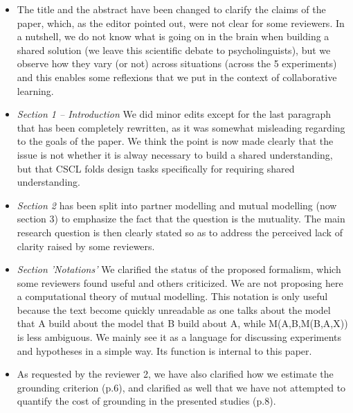 \documentclass{article}
\begin{document}
\begin{itemize}

    \item The title and the abstract have been changed to clarify the
        claims of the paper, which, as the editor pointed out, were not clear
        for some reviewers. In a nutshell, we do not know what is going on in the
        brain when building a shared solution (we leave this scientific debate
        to psycholinguists), but we observe how they vary (or not) across
        situations (across the 5 experiments) and this enables some reflexions
        that we put in the context of collaborative learning.

    \item \emph{Section 1 -- Introduction} We did minor edits except for the last
        paragraph that has been completely rewritten, as it was somewhat misleading
        regarding to the goals of the paper.  We think the point is now made
        clearly that the issue is not whether it is alway necessary to build a
        shared understanding, but that CSCL folds design tasks specifically for
        requiring shared understanding.

    \item \emph{Section 2} has been split into partner modelling and mutual modelling (now
        section 3) to emphasize the fact that the question is the mutuality. The
        main research question is then clearly stated so as to address the
        perceived lack of clarity raised by some reviewers.

    \item \emph{Section 'Notations'} We clarified the status of the proposed formalism, which some
        reviewers found useful and others criticized. We are not
        proposing here a computational theory of mutual modelling. This notation is
        only useful because the text become quickly unreadable as one talks about
        the model that A build about the model that B build about A, while
        M(A,B,M(B,A,X)) is less ambiguous. We mainly see it as a language for discussing
        experiments and hypotheses in a simple way. Its function is internal to
        this paper.

    \item As requested by the reviewer 2, we have also clarified how we estimate the
        grounding criterion (p.6), and clarified as well that we have not attempted to
        quantify the cost of grounding in the presented studies (p.8).


\end{itemize}
\end{document}

